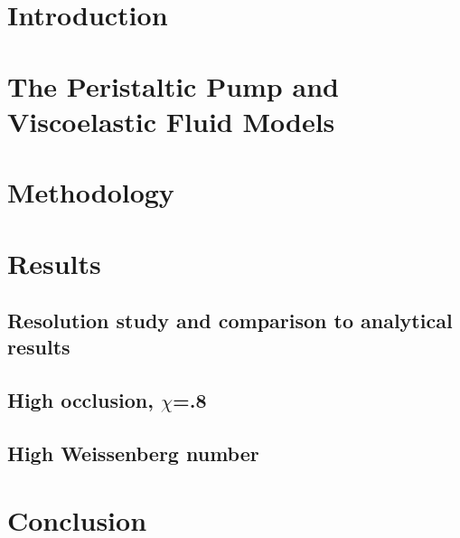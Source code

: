 

\section{Introduction}



\section{The Peristaltic Pump and Viscoelastic Fluid Models}
\label{Sec:Models}



\section{Methodology}
\label{Sec:Methodology}



\section{Results}
\label{sec:Results}


\subsection{Resolution study and comparison to analytical results}


\subsection{High occlusion, $\chi$=.8}


\subsection{High Weissenberg number}






\clearpage


\section{Conclusion}
\label{Sec:Conclusion}

